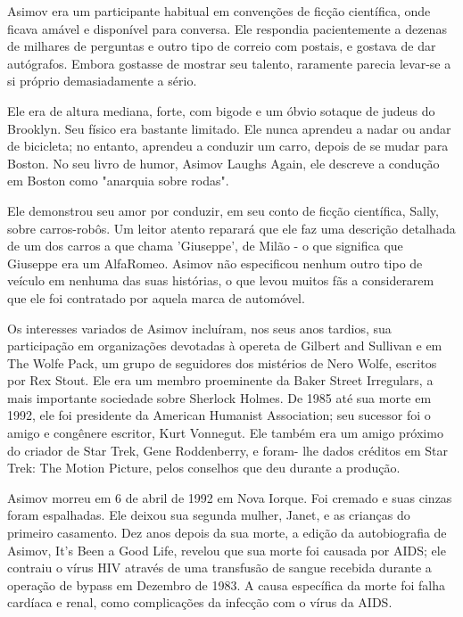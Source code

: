 \documentclass[14pt,portuguese]{extreport}
\begin{document}
      Asimov era um participante habitual em convenções de ficção
      científica, onde ficava amável e disponível para conversa. Ele
      respondia pacientemente a dezenas de milhares de perguntas e
      outro tipo de correio com postais, e gostava de dar autógrafos.
      Embora gostasse de mostrar seu talento, raramente parecia levar-se
      a si próprio demasiadamente a sério.
      
      Ele era de altura mediana, forte, com bigode e um óbvio
      sotaque de judeus do Brooklyn. Seu físico era bastante limitado. Ele
      nunca aprendeu a nadar ou andar de bicicleta; no entanto, aprendeu
      a conduzir um carro, depois de se mudar para Boston. No seu livro
      de humor, Asimov Laughs Again, ele descreve a condução em Boston
      como "anarquia sobre rodas".
      
      Ele demonstrou seu amor por conduzir, em seu conto de ficção
      científica, Sally, sobre carros-robôs. Um leitor atento reparará que
      ele faz uma descrição detalhada de um dos carros a que chama
      'Giuseppe', de Milão - o que significa que Giuseppe era um AlfaRomeo. 
      Asimov não especificou nenhum outro tipo de veículo em
      nenhuma das suas histórias, o que levou muitos fãs a considerarem
      que ele foi contratado por aquela marca de automóvel.
      
      Os interesses variados de Asimov incluíram, nos seus anos
      tardios, sua participação em organizações devotadas à opereta de
      Gilbert and Sullivan e em The Wolfe Pack, um grupo de seguidores
      dos mistérios de Nero Wolfe, escritos por Rex Stout. Ele era um
      membro proeminente da Baker Street Irregulars, a mais importante
      sociedade sobre Sherlock Holmes. De 1985 até sua morte em 1992,
      ele foi presidente da American Humanist Association; seu sucessor
      foi o amigo e congênere escritor, Kurt Vonnegut. Ele também era um
      amigo próximo do criador de Star Trek, Gene Roddenberry, e foram-
      lhe dados créditos em Star Trek: The Motion Picture, pelos conselhos
      que deu durante a produção.
      
      Asimov morreu em 6 de abril de 1992 em Nova Iorque. Foi
      cremado e suas cinzas foram espalhadas. Ele deixou sua segunda
      mulher, Janet, e as crianças do primeiro casamento. Dez anos depois
      da sua morte, a edição da autobiografia de Asimov, It's Been a Good
      Life, revelou que sua morte foi causada por AIDS; ele
      contraiu o vírus HIV através de uma transfusão de sangue recebida
      durante a operação de bypass em Dezembro de 1983. A causa
      específica da morte foi falha cardíaca e renal, como complicações da
      infecção com o vírus da AIDS.
      
\end{document}

